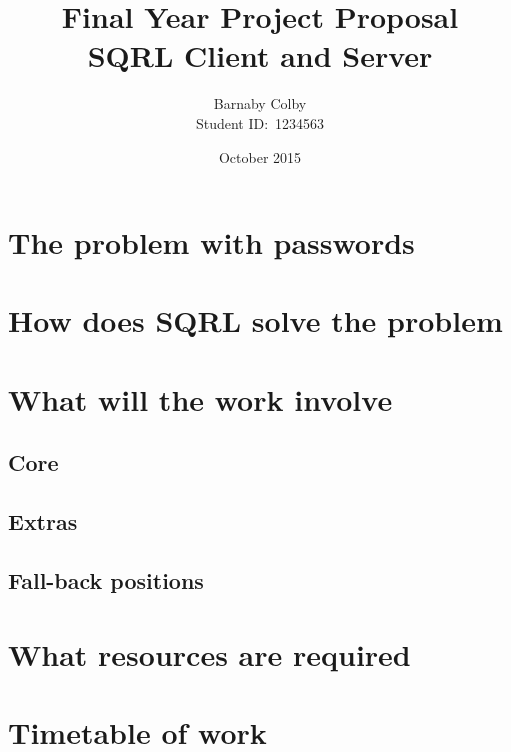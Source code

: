 \documentclass[a4paper]{article}
\begin{document}
\title{Final Year Project Proposal\\SQRL Client and Server}
\author{Barnaby Colby\\
Student ID:\ 1234563}
\date{October 2015}
\maketitle

\section*{The problem with passwords}
\section*{How does SQRL solve the problem}
\section*{What will the work involve}
    \subsection*{Core}
    \subsection*{Extras}
    \subsection*{Fall-back positions}
\section*{What resources are required}
\section*{Timetable of work}
\end{document}
